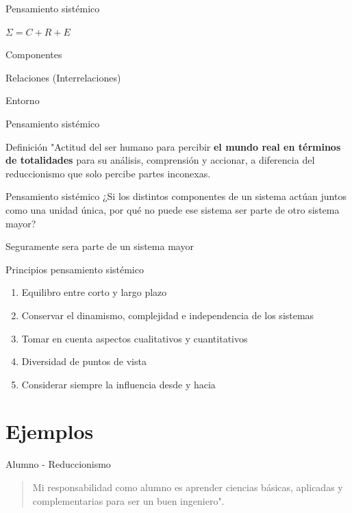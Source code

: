 \documentclass{beamer}
\begin{document}
\begin{frame}{Pensamiento sistémico}
	
{\large 	$ \Sigma = C + R + E$}

Componentes

Relaciones (Interrelaciones)

Entorno

\end{frame}

\begin{frame}{Pensamiento sistémico}
	\begin{alertblock}{Definición}
		"Actitud del ser humano para percibir \textbf{el mundo real en términos de totalidades} para su análisis, comprensión y accionar, a diferencia del reduccionismo que solo percibe partes inconexas.
	\end{alertblock}
\end{frame}

\begin{frame}{Pensamiento sistémico}
¿Si los distintos componentes de un sistema actúan juntos como una unidad única, por qué no puede ese sistema ser parte de otro sistema mayor?

\pause
Seguramente sera parte de un sistema mayor
\end{frame}

\begin{frame}{Principios pensamiento sistémico}
	\begin{enumerate}
		\item Equilibro entre corto y largo plazo
		\item Conservar el dinamismo, complejidad e independencia de los sistemas
		\item Tomar en cuenta aspectos cualitativos y cuantitativos
		\item Diversidad de puntos de vista
		\item Considerar siempre la influencia desde y hacia
	\end{enumerate}
\end{frame}

\section{Ejemplos}

\begin{frame}{Alumno - Reduccionismo}
	\begin{quote}
	Mi responsabilidad como alumno es aprender ciencias básicas, aplicadas y complementarias para ser un buen ingeniero".
	\end{quote}
\end{frame}
\end{document}
